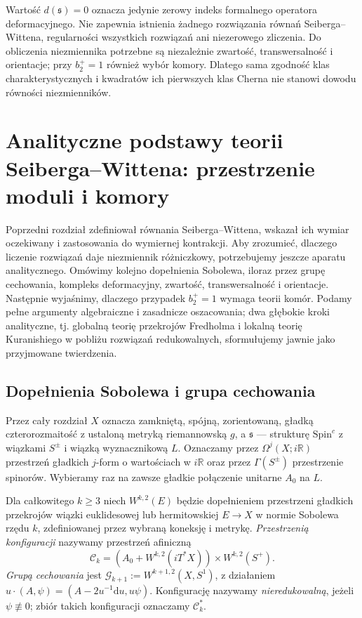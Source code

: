 \begin{uwaga}
Wartość $d(\mathfrak s)=0$ oznacza jedynie zerowy indeks
formalnego operatora deformacyjnego. Nie zapewnia istnienia
żadnego rozwiązania równań Seiberga--Wittena, regularności
wszystkich rozwiązań ani niezerowego zliczenia.
Do obliczenia niezmiennika potrzebne są niezależnie
zwartość, transwersalność i orientacje; przy $b_2^+=1$
również wybór komory. Dlatego sama zgodność klas
charakterystycznych i kwadratów ich pierwszych klas
Cherna nie stanowi dowodu równości niezmienników.
\end{uwaga}

\chapter{Analityczne podstawy teorii Seiberga--Wittena: przestrzenie moduli i komory}
\label{ch:tg-sw-analiza}

Poprzedni rozdział zdefiniował równania Seiberga--Wittena, wskazał ich
wymiar oczekiwany i zastosowania do wymiernej kontrakcji. Aby zrozumieć,
dlaczego liczenie rozwiązań daje niezmiennik różniczkowy, potrzebujemy
jeszcze aparatu analitycznego. Omówimy kolejno dopełnienia Sobolewa,
iloraz przez grupę cechowania, kompleks deformacyjny, zwartość,
transwersalność i orientacje. Następnie wyjaśnimy, dlaczego przypadek
$b_2^+=1$ wymaga teorii komór. Podamy pełne argumenty algebraiczne
i zasadnicze oszacowania; dwa głębokie kroki analityczne, tj. globalną
teorię przekrojów Fredholma i lokalną teorię Kuranishiego w pobliżu
rozwiązań redukowalnych, sformułujemy jawnie jako przyjmowane twierdzenia.

\section{Dopełnienia Sobolewa i grupa cechowania}
\label{sec:tg-sw-sobolev}

Przez cały rozdział $X$ oznacza zamkniętą, spójną, zorientowaną,
gładką czterorozmaitość z ustaloną metryką riemannowską $g$,
a $\mathfrak s$ --- strukturę $\mathrm{Spin}^c$ z wiązkami $S^\pm$
i wiązką wyznacznikową $L$. Oznaczamy przez
$\Omega^j(X;i\mathbb R)$ przestrzeń gładkich $j$-form o wartościach
w $i\mathbb R$ oraz przez $\Gamma(S^\pm)$ przestrzenie spinorów.
Wybieramy raz na zawsze gładkie połączenie unitarne $A_0$ na $L$.

\begin{definicja}
Dla całkowitego $k\geq3$ niech $W^{k,2}(E)$ będzie dopełnieniem
przestrzeni gładkich przekrojów wiązki euklidesowej lub hermitowskiej
$E\to X$ w normie Sobolewa rzędu $k$, zdefiniowanej przez
wybraną koneksję i metrykę. \emph{Przestrzenią konfiguracji} nazywamy
przestrzeń afiniczną
\[
\mathcal C_k=(A_0+W^{k,2}(iT^*X))\times W^{k,2}(S^+).
\]
\emph{Grupą cechowania} jest $\mathcal G_{k+1}:=W^{k+1,2}(X,S^1)$,
z działaniem $u\cdot(A,\psi)=(A-2u^{-1}\mathrm du,u\psi)$.
Konfigurację nazywamy \emph{nieredukowalną}, jeżeli
$\psi\not\equiv0$; zbiór takich konfiguracji oznaczamy
$\mathcal C_k^*$.
\end{definicja}


